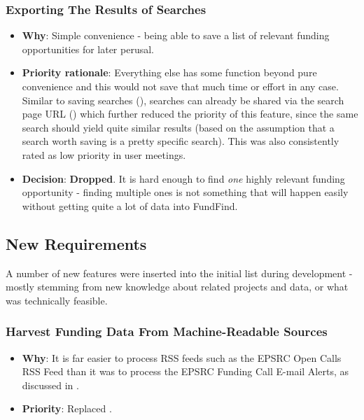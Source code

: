\subsubsection{Exporting The Results of Searches}
\begin{itemize}
 \item \textbf{Why}: Simple convenience - being able to save a list of relevant funding opportunities for later perusal.
 \item \textbf{Priority rationale}: Everything else has some function beyond pure convenience and this would not save that much time or effort in any case. Similar to saving searches (), searches can already be shared via the search page URL () which further reduced the priority of this feature, since the same search should yield quite similar results (based on the assumption that a search worth saving is a pretty specific search). This was also consistently rated as low priority in user meetings.
 \item \textbf{Decision}: \textbf{Dropped}. It is hard enough to find \emph{one} highly relevant funding opportunity - finding multiple ones is not something that will happen easily without getting quite a lot of data into FundFind.
\end{itemize}

\subsection{New Requirements}
\label{new-reqs}
A number of new features were inserted into the initial list during development - mostly stemming from new knowledge about related projects and data, or what was technically feasible.

\subsubsection{Harvest Funding Data From Machine-Readable Sources}
\begin{itemize}
 \item \textbf{Why}: It is far easier to process RSS feeds such as the EPSRC Open Calls RSS Feed \cite{epsrc-rss} than it was to process the EPSRC Funding Call E-mail Alerts, as discussed in .
 \item \textbf{Priority}: Replaced .
\end{itemize}

